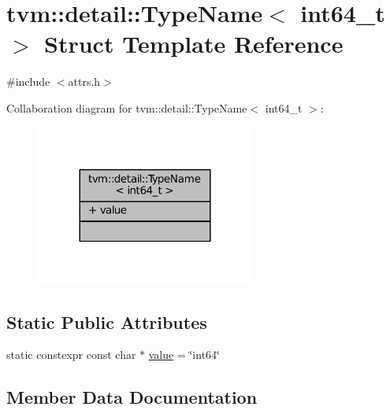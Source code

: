 \hypertarget{structtvm_1_1detail_1_1TypeName_3_01int64__t_01_4}{}\section{tvm\+:\+:detail\+:\+:Type\+Name$<$ int64\+\_\+t $>$ Struct Template Reference}
\label{structtvm_1_1detail_1_1TypeName_3_01int64__t_01_4}


{\ttfamily \#include $<$attrs.\+h$>$}



Collaboration diagram for tvm\+:\+:detail\+:\+:Type\+Name$<$ int64\+\_\+t $>$\+:
\nopagebreak
\begin{figure}[H]
\begin{center}
\leavevmode
\includegraphics[width=204pt]{structtvm_1_1detail_1_1TypeName_3_01int64__t_01_4__coll__graph}
\end{center}
\end{figure}
\subsection*{Static Public Attributes}
\begin{DoxyCompactItemize}
\item 
static constexpr const char $\ast$ \hyperlink{structtvm_1_1detail_1_1TypeName_3_01int64__t_01_4_a0c4adfb05b647001a3b365b723269fa4}{value} = \char`\"{}int64\char`\"{}
\end{DoxyCompactItemize}


\subsection{Member Data Documentation}
